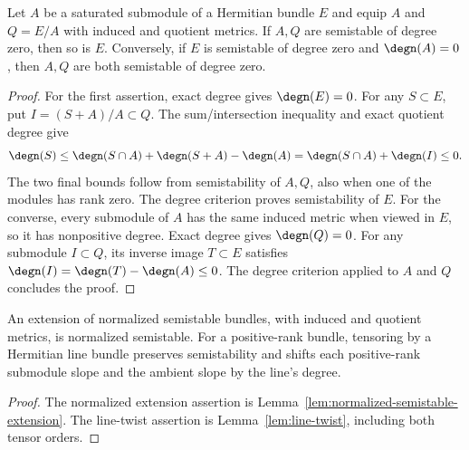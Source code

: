 \begin{lemma}
\label{lem:normalized-semistable-extension}
\leanok
Let $A$ be a saturated submodule of a Hermitian bundle $E$ and equip
$A$ and $Q=E/A$ with induced and quotient metrics.
If $A,Q$ are semistable of degree zero, then so is $E$.
Conversely, if $E$ is semistable of degree zero and $\degn(A)=0$,
then $A,Q$ are both semistable of degree zero.
\end{lemma}
\begin{proof}
For the first assertion, exact degree gives $\degn(E)=0$.
For any $S\subset E$, put $I=(S+A)/A\subset Q$.
The sum/intersection inequality and exact quotient degree give
\[
 \degn(S)\leq\degn(S\cap A)+\degn(S+A)-\degn(A)
 =\degn(S\cap A)+\degn(I)\leq0.
\]
The two final bounds follow from semistability of $A,Q$, also when
one of the modules has rank zero. The degree criterion proves
semistability of $E$.
For the converse, every submodule of $A$ has the same induced metric
when viewed in $E$, so it has nonpositive degree. Exact degree gives
$\degn(Q)=0$. For any submodule $I\subset Q$, its inverse image
$T\subset E$ satisfies $\degn(I)=\degn(T)-\degn(A)\leq0$.
The degree criterion applied to $A$ and $Q$ concludes the proof.
\end{proof}

\begin{lemma}
\label{lem:extensions-and-twists}
\leanok
{}
An extension of normalized semistable bundles, with induced and
quotient metrics, is normalized semistable. For a positive-rank bundle,
tensoring by a Hermitian line bundle preserves semistability and shifts
each positive-rank submodule slope and the ambient slope by the line's degree.
\end{lemma}
\begin{proof}
The normalized extension assertion is
Lemma~\ref{lem:normalized-semistable-extension}. The line-twist assertion
is Lemma~\ref{lem:line-twist}, including both tensor orders.
\end{proof}

